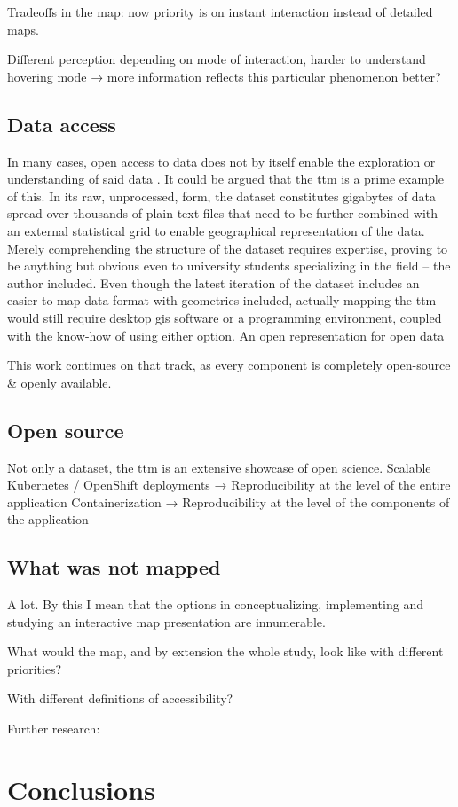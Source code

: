 Tradeoffs in the map:
now priority is on instant interaction instead of detailed maps.

Different perception depending on mode of interaction,
harder to understand hovering mode →
more information reflects this particular phenomenon better?


\subsection{Data access}


In many cases, open access to data does not by itself enable
the exploration or understanding of said data \parencite{obr2016}.
It could be argued that the \acrshort{ttm} is a prime example of this.
In its raw, unprocessed, form,
the dataset constitutes gigabytes of data spread over thousands of plain text files
that need to be further combined with an external statistical grid to enable
geographical representation of the data.
Merely comprehending the structure of the dataset requires expertise,
proving to be anything but obvious even to university students specializing in the field
-- the author included.
Even though the latest iteration of the dataset \parencite{fin2023}
includes an easier-to-map data format with geometries included,
actually mapping the \acrshort{ttm} would still require
desktop \acrshort{gis} software or a programming environment,
coupled with the know-how of using either option.
An open representation for open data

This work continues on that track,
as every component is completely open-source \& openly available.

\subsection{Open source}
Not only a dataset, the \acrshort{ttm} is an extensive showcase of open science.
Scalable Kubernetes / OpenShift deployments → Reproducibility at the level of the entire application
Containerization → Reproducibility at the level of the components of the application

\subsection{What was not mapped}

A lot. By this I mean that the options in
conceptualizing, implementing and studying an interactive map presentation are innumerable.

What would the map, and by extension the whole study, look like with different priorities?

With different definitions of accessibility?

Further research:


\section{Conclusions}
